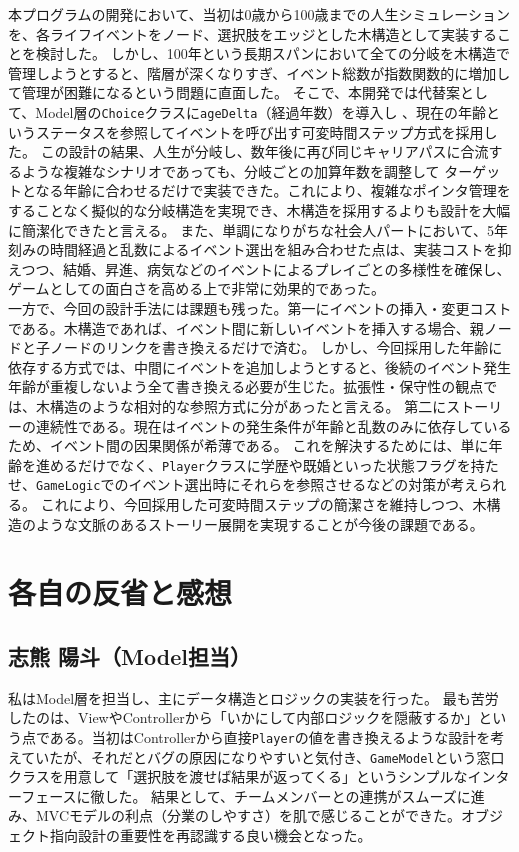 \documentclass[a4paper,11pt]{jsarticle}
\begin{document}
本プログラムの開発において、当初は0歳から100歳までの人生シミュレーションを、各ライフイベントをノード、選択肢をエッジとした木構造として実装することを検討した。
しかし、100年という長期スパンにおいて全ての分岐を木構造で管理しようとすると、階層が深くなりすぎ、イベント総数が指数関数的に増加して管理が困難になるという問題に直面した。
そこで、本開発では代替案として、Model層の\texttt{Choice}クラスに\texttt{ageDelta}（経過年数）を導入し
、現在の年齢というステータスを参照してイベントを呼び出す可変時間ステップ方式を採用した。
この設計の結果、人生が分岐し、数年後に再び同じキャリアパスに合流するような複雑なシナリオであっても、分岐ごとの加算年数を調整して
ターゲットとなる年齢に合わせるだけで実装できた。これにより、複雑なポインタ管理をすることなく擬似的な分岐構造を実現でき、木構造を採用するよりも設計を大幅に簡潔化できたと言える。
また、単調になりがちな社会人パートにおいて、5年刻みの時間経過と乱数によるイベント選出を組み合わせた点は、実装コストを抑えつつ、結婚、昇進、病気などのイベントによるプレイごとの多様性を確保し、
ゲームとしての面白さを高める上で非常に効果的であった。\\
一方で、今回の設計手法には課題も残った。第一にイベントの挿入・変更コストである。木構造であれば、イベント間に新しいイベントを挿入する場合、親ノードと子ノードのリンクを書き換えるだけで済む。
しかし、今回採用した年齢に依存する方式では、中間にイベントを追加しようとすると、後続のイベント発生年齢が重複しないよう全て書き換える必要が生じた。拡張性・保守性の観点では、木構造のような相対的な参照方式に分があったと言える。
第二にストーリーの連続性である。現在はイベントの発生条件が年齢と乱数のみに依存しているため、イベント間の因果関係が希薄である。
これを解決するためには、単に年齢を進めるだけでなく、\texttt{Player}クラスに学歴や既婚といった状態フラグを持たせ、\texttt{GameLogic}でのイベント選出時にそれらを参照させるなどの対策が考えられる。
これにより、今回採用した可変時間ステップの簡潔さを維持しつつ、木構造のような文脈のあるストーリー展開を実現することが今後の課題である。

\section{各自の反省と感想}

\subsection{志熊 陽斗（Model担当）}
私はModel層を担当し、主にデータ構造とロジックの実装を行った。
最も苦労したのは、ViewやControllerから「いかにして内部ロジックを隠蔽するか」という点である。当初はControllerから直接\texttt{Player}の値を書き換えるような設計を考えていたが、それだとバグの原因になりやすいと気付き、\texttt{GameModel}という窓口クラスを用意して「選択肢を渡せば結果が返ってくる」というシンプルなインターフェースに徹した。
結果として、チームメンバーとの連携がスムーズに進み、MVCモデルの利点（分業のしやすさ）を肌で感じることができた。オブジェクト指向設計の重要性を再認識する良い機会となった。
\end{document}

